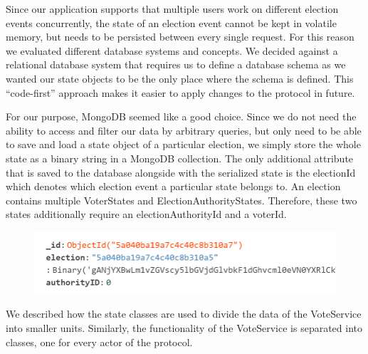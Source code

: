 Since our application supports that multiple users work on different election events concurrently, the state of an election event cannot be kept in volatile memory, but needs to be persisted between every single request. For this reason we evaluated different database systems and concepts. We decided against a relational database system that requires us to define a database schema as we wanted our state objects to be the only place where the schema is defined. This "`code-first"' approach makes it easier to apply changes to the protocol in future.

For our purpose, MongoDB seemed like a good choice. Since we do not need the ability to access and filter our data by arbitrary queries, but only need to be able to save and load a state object of a particular election, we simply store the whole state as a binary string in a MongoDB collection. The only additional attribute that is saved to the database alongside with the serialized state is the electionId which denotes which election event a particular state belongs to. An election contains multiple VoterStates and ElectionAuthorityStates. Therefore, these two states additionally require an electionAuthorityId and a voterId.

\begin{figure}
\begin{center}
\includegraphics[scale=0.75]{assets/db.png}
\label{dbexample}%
\end{center}
\end{figure}

We described how the state classes are used to divide the data of the VoteService into smaller units. Similarly, the functionality of the VoteService is separated into classes, one for every actor of the protocol.

